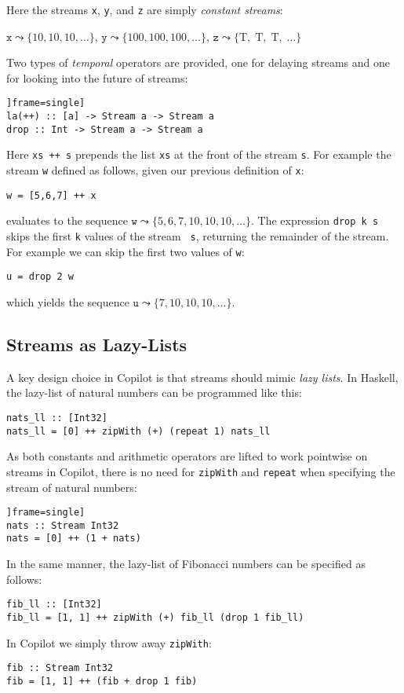 \noindent Here the streams {\tt x}, {\tt y}, and {\tt z} are simply
\emph{constant streams}:

\begin{center}
$\mathtt{x} \leadsto \{10, 10, 10, \dots \}$,
$\mathtt{y} \leadsto \{100, 100, 100,  \dots \}$,
$\mathtt{z} \leadsto \{\mbox{T},\; \mbox{T},\; \mbox{T},\; \dots \}$
\end{center}

Two types of \emph{temporal} operators are provided, one for delaying streams and one for
looking into the future of streams:
%
\begin{lstlisting}]frame=single]
la(++) :: [a] -> Stream a -> Stream a
drop :: Int -> Stream a -> Stream a
\end{lstlisting}
%
Here {\tt xs ++ s} prepends the list {\tt xs} at the front of the stream {\tt s}.
For example the stream {\tt w} defined as follows, given our previous definition
of {\tt x}:
%
\begin{lstlisting}
w = [5,6,7] ++ x
\end{lstlisting}
%
evaluates to the sequence
$\mathtt{w} \leadsto \{5, 6, 7, 10, 10, 10, \dots\}$.
The expression {\tt drop k s} skips the first {\tt k} values of the stream {\tt
  s}, returning the remainder of the stream.  
For example we can skip the first two values of {\tt w}:
%
\begin{lstlisting}
u = drop 2 w
\end{lstlisting}
%
which yields the sequence
$\mathtt{u} \leadsto \{7, 10, 10, 10, \dots\}$.

\subsection{Streams as Lazy-Lists} \label{sec:stream}

A key design choice in Copilot is that streams should mimic \emph{lazy lists}.
In Haskell, the lazy-list of natural numbers can be programmed like this:
%
\begin{lstlisting}[frame=single]
nats_ll :: [Int32]
nats_ll = [0] ++ zipWith (+) (repeat 1) nats_ll
\end{lstlisting}
%
As both constants and arithmetic operators are lifted to work pointwise on
streams in Copilot, there is no need for {\tt zipWith} and {\tt repeat} when
specifying the stream of natural numbers:
%
\begin{lstlisting}]frame=single]
nats :: Stream Int32
nats = [0] ++ (1 + nats)
\end{lstlisting}
%
In the same manner, the lazy-list of Fibonacci numbers can be specified as follows:
%
\begin{lstlisting}[frame=single]
fib_ll :: [Int32]
fib_ll = [1, 1] ++ zipWith (+) fib_ll (drop 1 fib_ll)
\end{lstlisting}
%
In Copilot we simply throw away {\tt zipWith}:
\begin{lstlisting}
fib :: Stream Int32
fib = [1, 1] ++ (fib + drop 1 fib)
\end{lstlisting}

